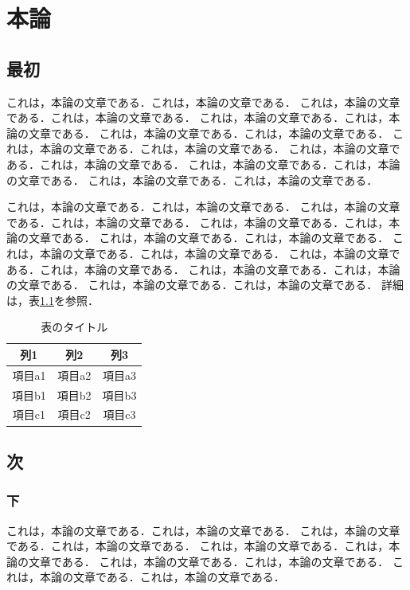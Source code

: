 \chapter{本論}

\section{最初}

これは，本論の文章である．これは，本論の文章である．
これは，本論の文章である．これは，本論の文章である．
これは，本論の文章である．これは，本論の文章である．
これは，本論の文章である．これは，本論の文章である．
これは，本論の文章である．これは，本論の文章である．
これは，本論の文章である．これは，本論の文章である．
これは，本論の文章である．これは，本論の文章である．
これは，本論の文章である．これは，本論の文章である．

これは，本論の文章である．これは，本論の文章である．
これは，本論の文章である．これは，本論の文章である．
これは，本論の文章である．これは，本論の文章である．
これは，本論の文章である．これは，本論の文章である．
これは，本論の文章である．これは，本論の文章である．
これは，本論の文章である．これは，本論の文章である．
これは，本論の文章である．これは，本論の文章である．
これは，本論の文章である．これは，本論の文章である．
詳細は，表\ref{table:sample}を参照．

\begin{table}[btp]
 \caption{\label{table:sample}表のタイトル}
 \begin{center}
  \begin{tabular}{ccc}
   \hline
   列1 & 列2 & 列3 \\
   \hline
   項目a1 & 項目a2 & 項目a3 \\
   項目b1 & 項目b2 & 項目b3 \\
   項目c1 & 項目c2 & 項目c3 \\
   \hline
  \end{tabular} 
 \end{center}
\end{table}

\section{次}

\subsection{下}

これは，本論の文章である．これは，本論の文章である．
これは，本論の文章である．これは，本論の文章である．
これは，本論の文章である．これは，本論の文章である．
これは，本論の文章である．これは，本論の文章である．
これは，本論の文章である．これは，本論の文章である．

